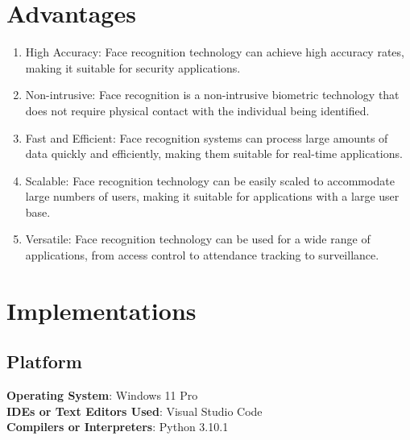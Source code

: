 \documentclass[openany]{report}
\begin{document}
\section{Advantages}
\begin{enumerate}
    \item High Accuracy: Face recognition technology can achieve high accuracy rates, making it suitable for security applications.
    \item Non-intrusive: Face recognition is a non-intrusive biometric technology that does not require physical contact with the individual being identified.
    \item Fast and Efficient: Face recognition systems can process large amounts of data quickly and efficiently, making them suitable for real-time applications.
    \item Scalable: Face recognition technology can be easily scaled to accommodate large numbers of users, making it suitable for applications with a large user base.
    \item Versatile: Face recognition technology can be used for a wide range of applications, from access control to attendance tracking to surveillance.
\end{enumerate}

\section{Implementations}

\subsection{Platform}
\textbf{Operating System}: Windows 11 Pro\\
\textbf{IDEs or Text Editors Used}: Visual Studio Code\\
\textbf{Compilers or Interpreters}: Python 3.10.1\\
\end{document}
